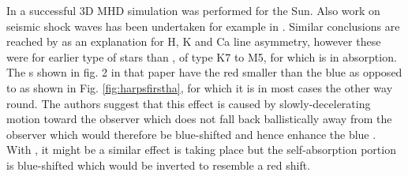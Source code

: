 In \citet{leenaarts12} a successful 3D MHD simulation was performed for the Sun. Also work on seismic shock waves has
been undertaken for example in \citet{donea06}. Similar conclusions are reached by \citet{rauscher06} as an explanation
for H, K and Ca line asymmetry, however these were for earlier type of stars than \prox, of type K7 to M5, for which
{\ha} is in absorption. The \horn s shown in fig. 2 in that paper have the red {\horn} smaller than the blue {\horn} as
opposed to {\prox} as shown in Fig. \ref{fig:harpsfirstha}, for which it is in most cases the other way round. The
authors suggest that this effect is caused by slowly-decelerating motion toward the observer which does not fall back
ballistically away from the observer which would therefore be blue-shifted and hence enhance the blue \horn. With \prox,
it might be a similar effect is taking place but the self-absorption portion is blue-shifted which would be inverted to
resemble a red shift.


